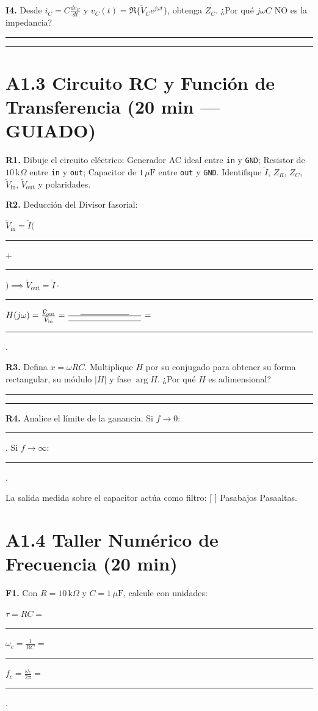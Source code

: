 \documentclass[11pt, a4paper]{article}
\begin{document}
\noindent\textbf{I4.} Desde $i_C = C \frac{dv_C}{dt}$ y $v_C(t) = \Re\{\tilde{V}_C e^{j\omega t}\}$, obtenga $Z_C$. ¿Por qué $j\omega C$ NO es la impedancia? \par
\noindent\rule{\textwidth}{0.4pt} \par\vspace{0.3cm}
\noindent\rule{\textwidth}{0.4pt}

\newpage
\section*{A1.3 Circuito RC y Función de Transferencia (20 min — GUIADO)}
\textbf{R1.} Dibuje el circuito eléctrico: Generador AC ideal entre \texttt{in} y \texttt{GND}; Resistor de $10\,\text{k}\Omega$ entre \texttt{in} y \texttt{out}; Capacitor de $1\,\mu\text{F}$ entre \texttt{out} y \texttt{GND}. Identifique $\tilde{I}$, $Z_R$, $Z_C$, $\tilde{V}_{\text{in}}$, $\tilde{V}_{\text{out}}$ y polaridades. \par\vspace{2.5cm}

\noindent\textbf{R2.} Deducción del Divisor fasorial: \par
$\tilde{V}_{\text{in}} = \tilde{I} ($ \rule{2cm}{0.4pt} $+$ \rule{2cm}{0.4pt} $) \implies \tilde{V}_{\text{out}} = \tilde{I} \cdot$ \rule{2cm}{0.4pt} \par
$H(j\omega) = \frac{\tilde{V}_{\text{out}}}{\tilde{V}_{\text{in}}} = \frac{\rule{2cm}{0.4pt}}{\rule{3cm}{0.4pt}} =$ \rule{4cm}{0.4pt}. \par\vspace{0.2cm}

\noindent\textbf{R3.} Defina $x = \omega RC$. Multiplique $H$ por su conjugado para obtener su forma rectangular, su módulo $\vert{}H\vert{}$ y fase $\arg H$. ¿Por qué $H$ es adimensional? \par\vspace{0.1cm}
\noindent\rule{\textwidth}{0.4pt} \par\vspace{0.3cm}
\noindent\rule{\textwidth}{0.4pt} \par\vspace{0.2cm}

\noindent\textbf{R4.} Analice el límite de la ganancia. Si $f \to 0$: \rule{3cm}{0.4pt}. Si $f \to \infty$: \rule{3cm}{0.4pt}. \par
La salida medida sobre el capacitor actúa como filtro: [ ] Pasabajos \quad [ ] Pasaaltas.

\section*{A1.4 Taller Numérico de Frecuencia (20 min)}
\textbf{F1.} Con $R=10\,\text{k}\Omega$ y $C=1\,\mu\text{F}$, calcule con unidades: \par
$\tau = RC =$ \rule{2cm}{0.4pt} \quad $\omega_c = \frac{1}{RC} =$ \rule{2cm}{0.4pt} \quad $f_c = \frac{\omega_c}{2\pi} =$ \rule{2.5cm}{0.4pt}. \par\vspace{0.2cm}
\end{document}
